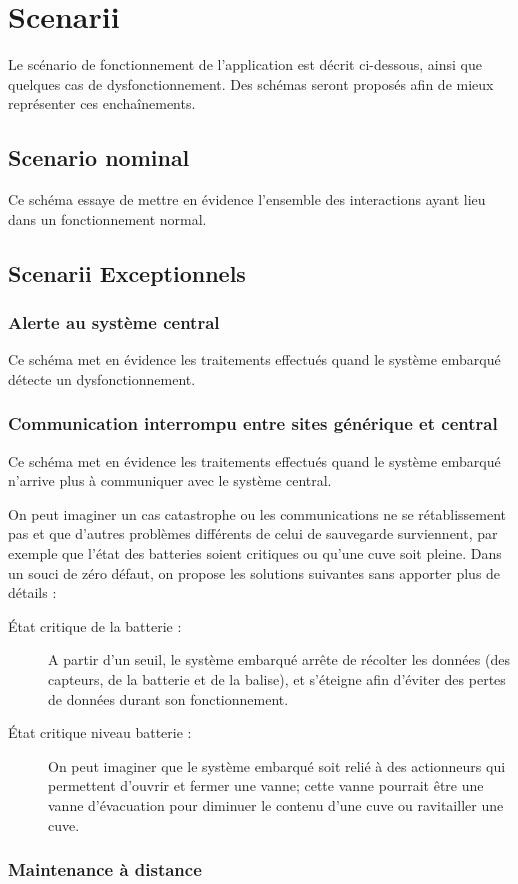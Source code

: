 \section{Scenarii}

Le scénario de fonctionnement de l'application est décrit ci-dessous, ainsi que quelques
cas de dysfonctionnement. Des schémas seront proposés afin de mieux représenter ces enchaînements.

    \subsection{Scenario nominal}
Ce schéma essaye de mettre en évidence l'ensemble des interactions ayant lieu dans un fonctionnement normal.

    \subsection{Scenarii Exceptionnels}

            \subsubsection{Alerte au système central}
Ce schéma met en évidence les traitements effectués quand le système embarqué détecte un dysfonctionnement.

            \subsubsection{Communication interrompu entre sites générique et central}
Ce schéma met en évidence les traitements effectués quand le système embarqué n'arrive plus à communiquer 
avec le système central.

On peut imaginer un cas catastrophe ou les communications ne se rétablissement pas et que d'autres problèmes différents de celui de sauvegarde surviennent, par exemple que l'état des batteries soient critiques ou qu'une cuve soit pleine. Dans un souci de zéro défaut, on propose les solutions suivantes sans apporter plus de détails :
 \begin{description}
        \item[État critique de la batterie :] A partir d'un seuil, le système embarqué arrête de récolter les données (des capteurs, de la batterie et de la balise), et s'éteigne afin d'éviter des pertes de données durant son fonctionnement.
        \item[État critique niveau batterie :] On peut imaginer que le système embarqué soit relié à des actionneurs qui permettent d'ouvrir et fermer une vanne; cette vanne pourrait être une vanne d'évacuation pour diminuer le contenu d'une cuve ou ravitailler une cuve.
\end{description}
            \subsubsection{Maintenance à distance}

